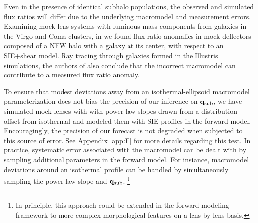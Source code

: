 Even in the presence of identical subhalo populations, the observed and simulated flux ratios will differ due to the underlying macromodel and measurement errors. Examining mock lens systems with luminous mass components from galaxies in the Virgo and Coma clusters, in \citet{Gilman++17} we found flux ratio anomalies in mock deflectors composed of a NFW halo with a galaxy at its center, with respect to an SIE+shear model. Ray tracing through galaxies formed in the Illustris simulations, the authors of \citet{Hsueh++17} also conclude that the incorrect macromodel can contribute to a measured flux ratio anomaly. 

To ensure that modest deviations away from an isothermal-ellipsoid macromodel parameterization does not bias the precision of our inference on ${\bf{q}_{\rm{sub}}}$, we have simulated mock lenses with with power law slopes drawn from a distribution offset from isothermal and modeled them with SIE profiles in the forward model. Encouragingly, the precision of our forecast is not degraded when subjected to this source of error. See Appendix \ref{app:E} for more details regarding this test. In practice, systematic error associated with the macromodel can be dealt with by sampling additional parameters in the forward model. For instance, macromodel deviations around an isothermal profile can be handled by simultaneously sampling the power law slope and ${\bf{q}_{\rm{sub}}}$. \footnote{In principle, this approach could be extended in the forward modeling framework to more complex morphological features on a lens by lens basis.}

